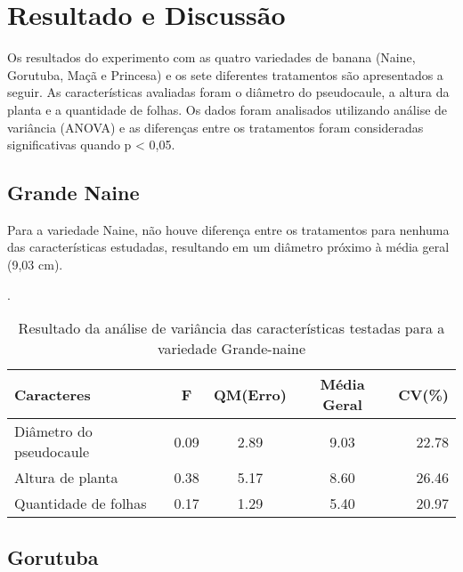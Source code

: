 \chapter{Resultado e Discussão}

Os resultados do experimento com as quatro variedades de banana (Naine, Gorutuba, Maçã e Princesa) e os sete diferentes tratamentos são apresentados a seguir. As características avaliadas foram o diâmetro do pseudocaule, a altura da planta e a quantidade de folhas. Os dados foram analisados utilizando análise de variância (ANOVA) e as diferenças entre os tratamentos foram consideradas significativas quando p < 0,05.
\section{Grande Naine}

Para a variedade Naine, não houve diferença entre os tratamentos para nenhuma das características estudadas, resultando em um diâmetro próximo à média geral (9,03 cm). 

\begin{table}[!htb]
 	\begin{center}
 		\caption{Resultado da análise de variância das características testadas para a variedade Grande-naine}.
	 	\begin{tabular*}{\textwidth}{@{\extracolsep{\fill}}lcccr}
 		\toprule
 		\toprule
 		\textbf{Caracteres} & \textbf{F}  & \textbf{QM(Erro)} & \textbf{Média Geral} &\textbf {CV(\%)} \\
		\hline
		Diâmetro do pseudocaule &0.09	&2.89		&9.03 	&22.78 \\
		Altura de planta 		&0.38 	&5.17 		&8.60 	&26.46 \\
		Quantidade de folhas 	&0.17  	&1.29 		&5.40 	&20.97\\
		\hline
		\hline
 		\end{tabular*}
 	\end{center}
\end{table}

\section{Gorutuba}
